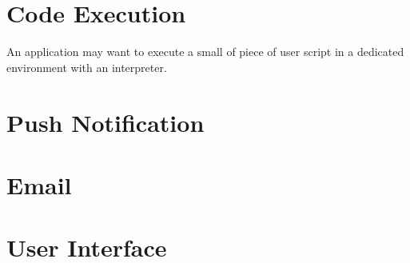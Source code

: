 \section{Code Execution}

An application may want to execute a small of piece of user script in a dedicated environment with an interpreter.

\section{Push Notification}

\section{Email}

\section{User Interface}
